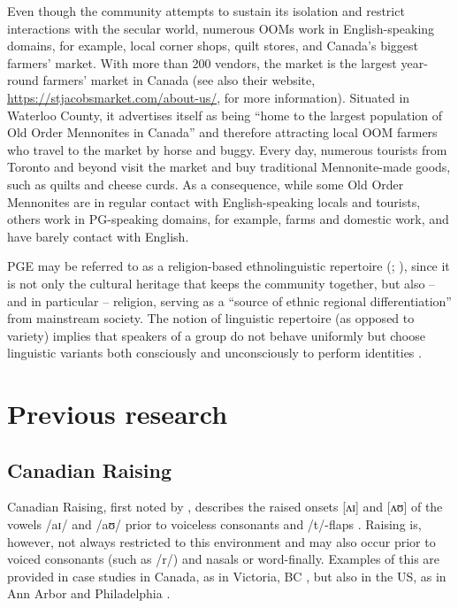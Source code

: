\documentclass[output=paper]{langscibook}
\begin{document}
Even though the community attempts to sustain its isolation and restrict interactions with the secular world, numerous \glspl*{OOM} work in English-speaking domains, for example, local corner shops, quilt stores, and Canada’s biggest farmers’ market. With more than 200 vendors, the market is the largest year-round farmers’ market in Canada (see also their website, \url{https://stjacobsmarket.com/about-us/}, for more information). Situated in Waterloo County, it advertises itself as being “home to the largest population of Old Order Mennonites in Canada” and therefore attracting local \gls*{OOM} farmers who travel to the market by horse and buggy. Every day, numerous tourists from Toronto and beyond visit the market and buy traditional Mennonite-made goods, such as quilts and cheese curds. As a consequence, while some Old Order Mennonites are in regular contact with English-speaking locals and tourists, others work in \gls*{PG}-speaking domains, for example, farms and domestic work, and have barely contact with English.

\gls*{PGE} may be referred to as a religion-based ethnolinguistic repertoire (\citealt[110]{rosen_vowel_2015}; \citealt[142]{benor_mensch_2011}), since it is not only the cultural heritage that keeps the community together, but also – and in particular – religion, serving as a “source of ethnic regional differentiation” \citep[147]{frantz_religion_2017} from mainstream society. The notion of linguistic repertoire (as opposed to variety) implies that speakers of a group do not behave uniformly but choose linguistic variants both consciously and unconsciously to perform identities \citep{benor_mensch_2011}.

\section{Previous research}\label{neuhausen:sec:3}
\subsection{Canadian Raising}\label{neuhausen:sec:3.1}

Canadian Raising, first noted by \citet{joos_phonological_1942}, describes the raised onsets [ʌɪ] and [ʌʊ] of the vowels /aɪ/ and /aʊ/ prior to voiceless consonants and /t/-flaps \citep{dailey-ocain_canadian_1997,rosenfelder_canadian_2007,fruehwald_spread_2008}. Raising is, however, not always restricted to this environment and may also occur prior to voiced consonants (such as /r/) and nasals or word-finally. Examples of this are provided in case studies in Canada, as in Victoria, BC \citep{rosenfelder_canadian_2007}, but also in the US, as in Ann Arbor \citep{dailey-ocain_canadian_1997} and Philadelphia \citep{fruehwald_spread_2008}.
\end{document}
